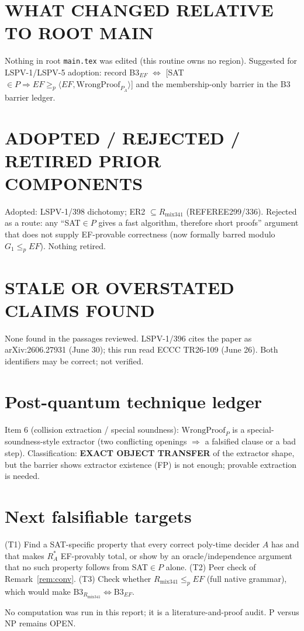 \documentclass[11pt]{article}
\theoremstyle{definition}
\begin{document}
\section*{WHAT CHANGED RELATIVE TO ROOT MAIN}
Nothing in root \texttt{main.tex} was edited (this routine owns no region). Suggested for LSPV-1/LSPV-5 adoption: record B3$_{EF}$ $\iff$ [SAT$\in P\Rightarrow EF\ge_p\langle EF,\mathrm{WrongProof}_{P_A}\rangle$] and the membership-only barrier in the B3 barrier ledger.

\section*{ADOPTED / REJECTED / RETIRED PRIOR COMPONENTS}
Adopted: LSPV-1/398 dichotomy; ER2 $\subseteq R_{\mathrm{mix341}}$ (REFEREE299/336). Rejected as a route: any ``SAT$\in P$ gives a fast algorithm, therefore short proofs'' argument that does not supply EF-provable correctness (now formally barred modulo $G_1\le_p EF$). Nothing retired.

\section*{STALE OR OVERSTATED CLAIMS FOUND}
None found in the passages reviewed. LSPV-1/396 cites the paper as arXiv:2606.27931 (June 30); this run read ECCC TR26-109 (June 26). Both identifiers may be correct; not verified.

\section*{Post-quantum technique ledger}
Item 6 (collision extraction / special soundness): $\mathrm{WrongProof}_P$ is a special-soundness-style extractor (two conflicting openings $\Rightarrow$ a falsified clause or a bad step). Classification: \textbf{EXACT OBJECT TRANSFER} of the extractor shape, but the barrier shows extractor existence (FP) is not enough; provable extraction is needed.

\section*{Next falsifiable targets}
(T1) Find a SAT-specific property that every correct poly-time decider $A$ has and that makes $R^\ast_A$ EF-provably total, or show by an oracle/independence argument that no such property follows from SAT$\in P$ alone. (T2) Peer check of Remark~\ref{rem:conv}. (T3) Check whether $R_{\mathrm{mix341}}\le_p EF$ (full native grammar), which would make $\mathrm{B3}_{R_{\mathrm{mix341}}}\iff\mathrm{B3}_{EF}$.

\noindent No computation was run in this report; it is a literature-and-proof audit. P versus NP remains OPEN.

\end{document}
